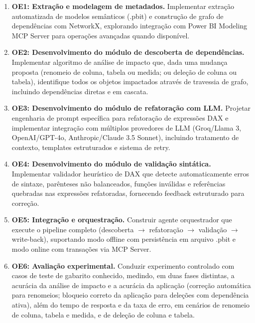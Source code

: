 \documentclass[
    12pt,               %
    openright,          %
    oneside,            %
    a4paper,            %
    chapter=TITLE,      %
    section=TITLE,      %
    brazil              %
]{abntex2}
\begin{document}
\begin{enumerate}
    \item \textbf{OE1: Extração e modelagem de metadados.} Implementar extração automatizada de modelos semânticos (.pbit) e construção de grafo de dependências com NetworkX, explorando integração com Power BI Modeling MCP Server para operações avançadas quando disponível.

    \item \textbf{OE2: Desenvolvimento do módulo de descoberta de dependências.} Implementar algoritmo de análise de impacto que, dada uma mudança proposta (renomeio de coluna, tabela ou medida; ou deleção de coluna ou tabela), identifique todos os objetos impactados através de travessia de grafo, incluindo dependências diretas e em cascata.

    \item \textbf{OE3: Desenvolvimento do módulo de refatoração com LLM.} Projetar engenharia de prompt específica para refatoração de expressões DAX e implementar integração com múltiplos provedores de LLM (Groq/Llama 3, OpenAI/GPT-4o, Anthropic/Claude 3.5 Sonnet), incluindo tratamento de contexto, templates estruturados e sistema de retry.

    \item \textbf{OE4: Desenvolvimento do módulo de validação sintática.} Implementar validador heurístico de DAX que detecte automaticamente erros de sintaxe, parênteses não balanceados, funções inválidas e referências quebradas nas expressões refatoradas, fornecendo feedback estruturado para correção.

    \item \textbf{OE5: Integração e orquestração.} Construir agente orquestrador que execute o pipeline completo (descoberta $\rightarrow$ refatoração $\rightarrow$ validação $\rightarrow$ write-back), suportando modo offline com persistência em arquivo .pbit e modo online com transações via MCP Server.

    \item \textbf{OE6: Avaliação experimental.} Conduzir experimento controlado com casos de teste de gabarito conhecido, medindo, em duas fases distintas, a acurácia da análise de impacto e a acurácia da aplicação (correção automática para renomeios; bloqueio correto da aplicação para deleções com dependência ativa), além do tempo de resposta e da taxa de erro, em cenários de renomeio de coluna, tabela e medida, e de deleção de coluna e tabela.
\end{enumerate}
\end{document}
